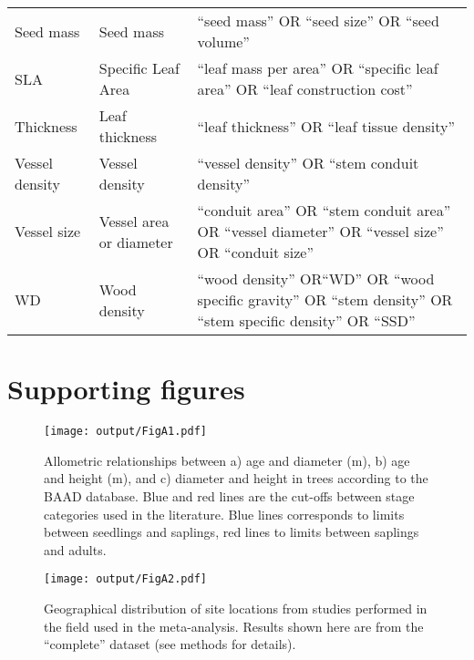 \documentclass[a4paper,11pt]{article}
\begin{document}
\begin{appendices}
\begin{table}[h!]
{\begin{tabular}{p{3cm}p{3cm}p{8cm}}
  Seed mass & Seed mass & ``seed mass'' OR ``seed size'' OR ``seed volume'' \\
  SLA & Specific Leaf Area & ``leaf mass per area'' OR ``specific leaf area'' OR ``leaf construction cost'' \\
  Thickness & Leaf thickness & ``leaf thickness''  OR ``leaf tissue density'' \\
  Vessel density & Vessel density & ``vessel density'' OR ``stem conduit density'' \\
  Vessel size & Vessel area or diameter & ``conduit area'' OR ``stem conduit area'' OR ``vessel diameter'' OR ``vessel size'' OR ``conduit size''   \\
  WD & Wood density & ``wood density'' OR``WD'' OR ``wood specific gravity'' OR ``stem density'' OR ``stem specific density'' OR ``SSD'' \\
   \hline
\end{tabular}
}
\end{table}


\clearpage
\section{Supporting figures}\label{app:supp_info_figures}


\begin{figure}[h!]
\centering
\texttt{[image: output/FigA1.pdf]}
\caption{Allometric relationships between a) age and diameter (m), b) age and height (m), and c) diameter and height in trees according to the BAAD database. Blue and red lines are the cut-offs between stage categories used in the literature. Blue lines corresponds to limits between seedlings and saplings, red lines to limits between saplings and adults.}
\label{fig:figA1}
\end{figure}


\begin{figure}[h!]
\centering
\texttt{[image: output/FigA2.pdf]}
\caption{Geographical distribution of site locations from studies performed in the field used in the meta-analysis. Results shown here are from the ``complete'' dataset (see methods for details).}
\label{fig:figA2}
\end{figure}



\end{appendices}
\end{document}
